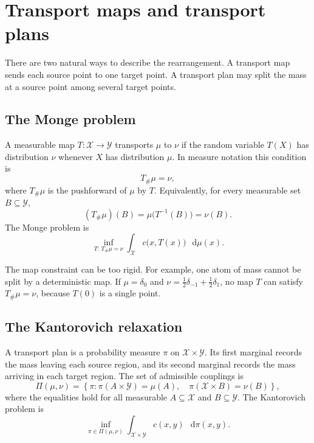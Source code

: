\documentclass[11pt]{article}
\newcommand{\dd}{\mathop{}\!\mathrm{d}}
\begin{document}
\section{Transport maps and transport plans}

There are two natural ways to describe the rearrangement. A transport map
sends each source point to one target point. A transport plan may split the
mass at a source point among several target points.

\subsection{The Monge problem}

A measurable map $T:\mathcal X\to\mathcal Y$ transports $\mu$ to $\nu$ if
the random variable $T(X)$ has distribution $\nu$ whenever $X$ has
distribution $\mu$. In measure notation this condition is
\begin{equation}
  T_{\#}\mu=\nu,
  \label{eq:pushforward}
\end{equation}
where $T_{\#}\mu$ is the pushforward of $\mu$ by $T$. Equivalently, for
every measurable set $B\subseteq\mathcal Y$,
\begin{equation}
  (T_{\#}\mu)(B)=\mu\bigl(T^{-1}(B)\bigr)=\nu(B).
\end{equation}
The Monge problem is
\begin{equation}
  \inf_{T:\,T_{\#}\mu=\nu}
  \int_{\mathcal X}c\bigl(x,T(x)\bigr)\,\dd\mu(x).
  \label{eq:monge}
\end{equation}

The map constraint can be too rigid. For example, one atom of mass cannot be
split by a deterministic map. If $\mu=\delta_0$ and
$\nu=\tfrac12\delta_{-1}+\tfrac12\delta_1$, no map $T$ can satisfy
$T_{\#}\mu=\nu$, because $T(0)$ is a single point.

\subsection{The Kantorovich relaxation}

A transport plan is a probability measure $\pi$ on
$\mathcal X\times\mathcal Y$. Its first marginal records the mass leaving
each source region, and its second marginal records the mass arriving in each
target region. The set of admissible couplings is
\begin{equation}
  \Pi(\mu,\nu)
  =\left\{\pi:
  \pi(A\times\mathcal Y)=\mu(A),\quad
  \pi(\mathcal X\times B)=\nu(B)
  \right\},
  \label{eq:couplings}
\end{equation}
where the equalities hold for all measurable
$A\subseteq\mathcal X$ and $B\subseteq\mathcal Y$. The Kantorovich problem
is
\begin{equation}
  \inf_{\pi\in\Pi(\mu,\nu)}
  \int_{\mathcal X\times\mathcal Y}c(x,y)\,\dd\pi(x,y).
  \label{eq:kantorovich}
\end{equation}
\end{document}
